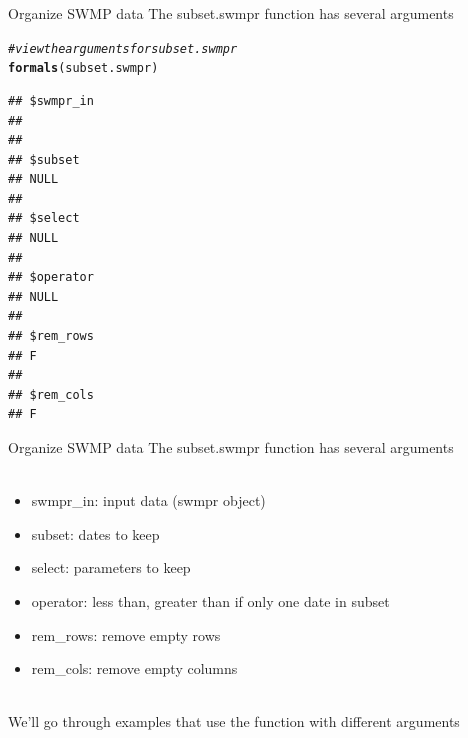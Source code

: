 \documentclass[xcolor=svgnames]{beamer}\usepackage[]{graphicx}\usepackage[]{color}
\makeatletter
\newcommand{\hlcom}[1]{\textcolor[rgb]{0.678,0.584,0.686}{\textit{#1}}}%
\newcommand{\hlstd}[1]{\textcolor[rgb]{0.345,0.345,0.345}{#1}}%
\newcommand{\hlkwd}[1]{\textcolor[rgb]{0.737,0.353,0.396}{\textbf{#1}}}%
\newenvironment{kframe}{%
 \def\at@end@of@kframe{}%
 \ifinner\ifhmode%
  \def\at@end@of@kframe{\end{minipage}}%
  \begin{minipage}{\columnwidth}%
 \fi\fi%
 \def\FrameCommand##1{\hskip\@totalleftmargin \hskip-\fboxsep
 \colorbox{shadecolor}{##1}\hskip-\fboxsep
     \hskip-\linewidth \hskip-\@totalleftmargin \hskip\columnwidth}%
 \MakeFramed {\advance\hsize-\width
   \@totalleftmargin\z@ \linewidth\hsize
   \@setminipage}}%
 {\par\unskip\endMakeFramed%
 \at@end@of@kframe}
\newenvironment{knitrout}{}{} %
\makeatother
\begin{document}
\begin{frame}[containsverbatim]{Organize SWMP data}
The subset.swmpr function has several arguments
\begin{knitrout}\scriptsize
{}\color{fgcolor}\begin{kframe}
\begin{alltt}
\hlcom{# view the arguments for subset.swmpr}
\hlkwd{formals}\hlstd{(subset.swmpr)}
\end{alltt}
\begin{verbatim}
## $swmpr_in
## 
## 
## $subset
## NULL
## 
## $select
## NULL
## 
## $operator
## NULL
## 
## $rem_rows
## F
## 
## $rem_cols
## F
\end{verbatim}
\end{kframe}
\end{knitrout}
\end{frame}

\begin{frame}[containsverbatim]{Organize SWMP data}
The subset.swmpr function has several arguments \\~\\
\begin{itemize}
\item swmpr\_in: input data (swmpr object)
\item subset: dates to keep
\item select: parameters to keep
\item operator: less than, greater than if only one date in subset
\item rem\_rows: remove empty rows
\item rem\_cols: remove empty columns \\~\\
\end{itemize}
We'll go through examples that use the function with different arguments
\end{frame}
\end{document}
